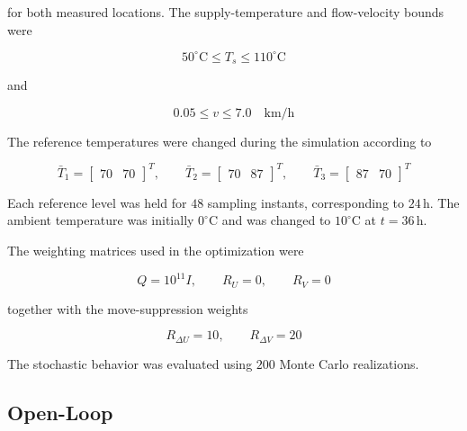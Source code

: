 for both measured locations. The supply-temperature and flow-velocity bounds
were

\begin{equation}
    50^\circ\mathrm{C}
    \leq
    T_s
    \leq
    110^\circ\mathrm{C}
\end{equation}

and

\begin{equation}
    0.05
    \leq
    v
    \leq
    7.0
    \quad \mathrm{km/h}
\end{equation}

The reference temperatures were changed during the simulation according to

\begin{equation}
    \bar{T}_1
    =
    \begin{bmatrix}
        70 & 70
    \end{bmatrix}^{T},
    \qquad
    \bar{T}_2
    =
    \begin{bmatrix}
        70 & 87
    \end{bmatrix}^{T},
    \qquad
    \bar{T}_3
    =
    \begin{bmatrix}
        87 & 70
    \end{bmatrix}^{T}
\end{equation}

Each reference level was held for \(48\) sampling instants, corresponding to
\(24\,\mathrm{h}\). The ambient temperature was initially
\(0^\circ\mathrm{C}\) and was changed to \(10^\circ\mathrm{C}\) at
\(t=36\,\mathrm{h}\).

The weighting matrices used in the optimization were

\begin{equation}
    Q=10^{11}I,
    \qquad
    R_U=0,
    \qquad
    R_V=0
\end{equation}

together with the move-suppression weights

\begin{equation}
    R_{\Delta U}=10,
    \qquad
    R_{\Delta V}=20
\end{equation}

The stochastic behavior was evaluated using \(200\) Monte Carlo
realizations.


\subsection{Open-Loop}
\label{subsec:district_open_loop_results}

